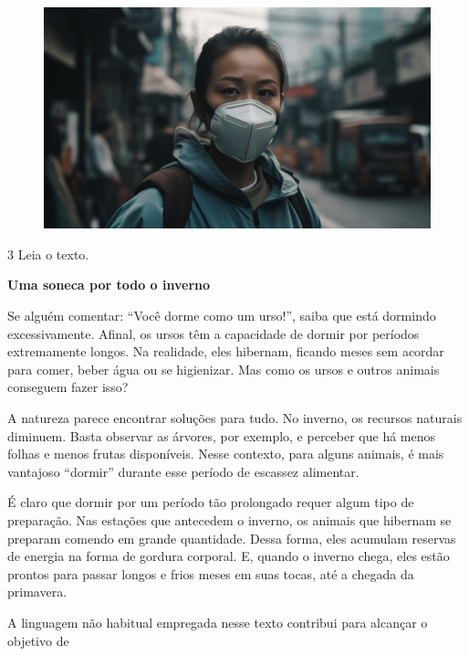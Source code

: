 \begin{figure}[H]
\centering
\includegraphics[width=.9\textwidth]{./imgSAEB_8_POR/media/image43.png}
\end{figure}

\num{3} Leia o texto.

\begin{myquote}
\textbf{Uma soneca por todo o inverno}

Se alguém comentar: ``Você dorme como um urso!'', saiba que está
dormindo excessivamente. Afinal, os ursos têm a capacidade de dormir por
períodos extremamente longos. Na realidade, eles hibernam, ficando meses
sem acordar para comer, beber água ou se higienizar. Mas como os ursos e
outros animais conseguem fazer isso?

A natureza parece encontrar soluções para tudo. No inverno, os recursos
naturais diminuem. Basta observar as árvores, por exemplo, e perceber
que há menos folhas e menos frutas disponíveis. Nesse contexto, para
alguns animais, é mais vantajoso ``dormir'' durante esse período de
escassez alimentar.

É claro que dormir por um período tão prolongado requer algum tipo de
preparação. Nas estações que antecedem o inverno, os animais que
hibernam se preparam comendo em grande quantidade. Dessa forma, eles
acumulam reservas de energia na forma de gordura corporal. E, quando o
inverno chega, eles estão prontos para passar longos e frios meses em
suas tocas, até a chegada da primavera.

\end{myquote}

A linguagem não habitual empregada nesse texto contribui para alcançar o
objetivo de


